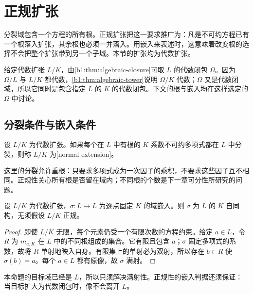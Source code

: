 
\section{正规扩张}
\label{b1:sec:1503}


%
%

分裂域包含一个方程的所有根。正规扩张把这一要求推广为：凡是不可约方程已有一个根落入扩张，其余根也必须一并落入。用嵌入来表述时，这意味着改变根的选择不会把整个扩张带到另一个子域。本节的扩张均为代数扩张。

\ProseParagraphBreak
给定代数扩张 \(L/K\)，由\cref{b1:thm:algebraic-closure}可取 \(L\) 的代数闭包 \(\Omega\)。因为 \(\Omega/L\) 与 \(L/K\) 都代数，\cref{b1:thm:algebraic-tower}说明 \(\Omega/K\) 代数；\(\Omega\) 又是代数闭域，所以它同时是包含指定 \(L\) 的 \(K\) 的代数闭包。下文的根与嵌入均在这样选定的 \(\Omega\) 中讨论。

\subsection{分裂条件与嵌入条件}
\label{b1:subsec:1503:01}

\begin{definition}\label{b1:def:normal-extension}
	设 \(L/K\) 为代数扩张。如果每个在 \(L\) 中有根的 \(K\) 系数不可约多项式都在 \(L\) 中分裂，则称 \(L/K\) 为[normal extension]。
\end{definition}
这里的分裂允许重根：只要求多项式成为一次因子的乘积，不要求这些因子互不相同。正规性关心所有根是否留在域内；不同根的个数是下一章可分性所研究的问题。

\begin{proposition}\label{b1:prop:algebraic-self-embedding}
	设 \(L/K\) 为代数扩张，\(\sigma:L\rightarrow L\) 为逐点固定 \(K\) 的域嵌入。则 \(\sigma\) 为 \(L\) 的 \(K\) 自同构，无须假设 \(L/K\) 正规。
\end{proposition}
\begin{proof}
	即使 \(L/K\) 无限，每个元素仍受一个有限次数的方程约束。给定 \(a\in L\)，令 \(R\) 为 \(m_{a,K}\) 在 \(L\) 中的不同根组成的集合。它有限且包含 \(a\)；\(\sigma\) 固定多项式的系数，故将 \(R\) 单射地映入自身。有限集上的单射必为双射，所以存在 \(b\in R\) 使 \(\sigma(b)=a\)。每个 \(a\in L\) 都有原像，故 \(\sigma\) 满射。
\end{proof}
本命题的目标域已经是 \(L\)，所以只须解决满射性。正规性的嵌入判据还须保证：当目标扩大为代数闭包时，像不会离开 \(L\)。

